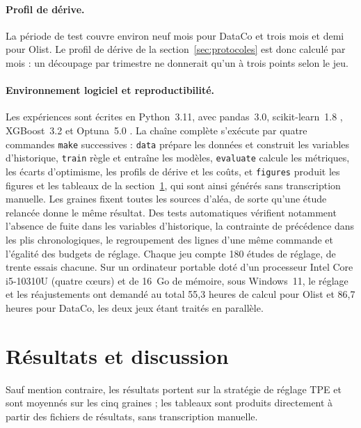 \documentclass[11pt,a4paper]{article}
\theoremstyle{definition}
\begin{document}
\paragraph{Profil de dérive.} La période de test couvre environ neuf mois pour DataCo et trois mois et demi pour Olist. Le profil de dérive de la section~\ref{sec:protocoles} est donc calculé par mois : un découpage par trimestre ne donnerait qu'un à trois points selon le jeu.

\paragraph{Environnement logiciel et reproductibilité.} Les expériences sont écrites en Python~3.11, avec pandas~3.0, scikit-learn~1.8 \cite{pedregosa2011scikit}, XGBoost~3.2 \cite{chen2016xgboost} et Optuna~5.0 \cite{akiba2019optuna}. La chaîne complète s'exécute par quatre commandes \texttt{make} successives : \texttt{data} prépare les données et construit les variables d'historique, \texttt{train} règle et entraîne les modèles, \texttt{evaluate} calcule les métriques, les écarts d'optimisme, les profils de dérive et les coûts, et \texttt{figures} produit les figures et les tableaux de la section~\ref{sec:results}, qui sont ainsi générés sans transcription manuelle. Les graines fixent toutes les sources d'aléa, de sorte qu'une étude relancée donne le même résultat. Des tests automatiques vérifient notamment l'absence de fuite dans les variables d'historique, la contrainte de précédence dans les plis chronologiques, le regroupement des lignes d'une même commande et l'égalité des budgets de réglage. Chaque jeu compte 180 études de réglage, de trente essais chacune. Sur un ordinateur portable doté d'un processeur Intel Core i5-10310U (quatre cœurs) et de 16~Go de mémoire, sous Windows~11, le réglage et les réajustements ont demandé au total 55,3 heures de calcul pour Olist et 86,7 heures pour DataCo, les deux jeux étant traités en parallèle.

\section{Résultats et discussion}
\label{sec:results}

Sauf mention contraire, les résultats portent sur la stratégie de réglage TPE et sont moyennés sur les cinq graines ; les tableaux sont produits directement à partir des fichiers de résultats, sans transcription manuelle.
\end{document}
